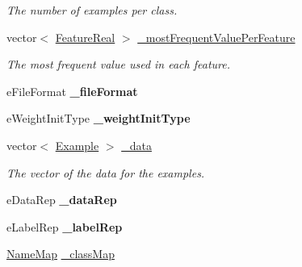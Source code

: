 \begin{DoxyCompactItemize}
\begin{DoxyCompactList}\small\item\em The number of examples per class. \end{DoxyCompactList}\item 
\hypertarget{classMultiBoost_1_1RawData_a779d9df345986a3ee2c7efe26f6fd967}{vector$<$ \hyperlink{Defaults_8h_a3a11cfe6a5d469d921716ca6291e934f}{Feature\-Real} $>$ \hyperlink{classMultiBoost_1_1RawData_a779d9df345986a3ee2c7efe26f6fd967}{\-\_\-most\-Frequent\-Value\-Per\-Feature}}\label{classMultiBoost_1_1RawData_a779d9df345986a3ee2c7efe26f6fd967}

\begin{DoxyCompactList}\small\item\em The most frequent value used in each feature. \end{DoxyCompactList}\item 
\hypertarget{classMultiBoost_1_1RawData_a8e9505b9bb97b9b1634059f14773a7b5}{e\-File\-Format {\bfseries \-\_\-file\-Format}}\label{classMultiBoost_1_1RawData_a8e9505b9bb97b9b1634059f14773a7b5}

\item 
\hypertarget{classMultiBoost_1_1RawData_a957b14bb2f413d4b33d59a75d035e822}{e\-Weight\-Init\-Type {\bfseries \-\_\-weight\-Init\-Type}}\label{classMultiBoost_1_1RawData_a957b14bb2f413d4b33d59a75d035e822}

\item 
\hypertarget{classMultiBoost_1_1RawData_a86f9be0e641095d46bb61ed4ae6f15f2}{vector$<$ \hyperlink{classMultiBoost_1_1Example}{Example} $>$ \hyperlink{classMultiBoost_1_1RawData_a86f9be0e641095d46bb61ed4ae6f15f2}{\-\_\-data}}\label{classMultiBoost_1_1RawData_a86f9be0e641095d46bb61ed4ae6f15f2}

\begin{DoxyCompactList}\small\item\em The vector of the data for the examples. \end{DoxyCompactList}\item 
\hypertarget{classMultiBoost_1_1RawData_afe80f4aa17b61ec80ed9f975cd2bbe1d}{e\-Data\-Rep {\bfseries \-\_\-data\-Rep}}\label{classMultiBoost_1_1RawData_afe80f4aa17b61ec80ed9f975cd2bbe1d}

\item 
\hypertarget{classMultiBoost_1_1RawData_a7bc8f0fd128d8c4a0c792d6ca381a5b7}{e\-Label\-Rep {\bfseries \-\_\-label\-Rep}}\label{classMultiBoost_1_1RawData_a7bc8f0fd128d8c4a0c792d6ca381a5b7}

\item 
\hypertarget{classMultiBoost_1_1RawData_a62a84ed4e8bde4d493a8649649589f0d}{\hyperlink{classMultiBoost_1_1NameMap}{Name\-Map} \hyperlink{classMultiBoost_1_1RawData_a62a84ed4e8bde4d493a8649649589f0d}{\-\_\-class\-Map}}\label{classMultiBoost_1_1RawData_a62a84ed4e8bde4d493a8649649589f0d}


\end{DoxyCompactItemize}
